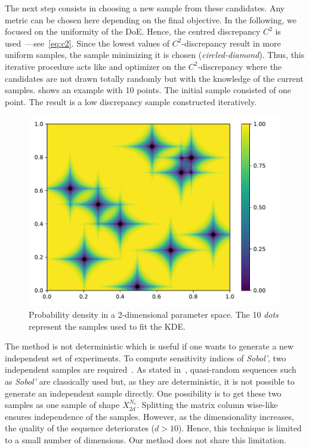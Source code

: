 The next step consists in choosing a new sample from these candidates. Any metric can be chosen here depending on the final objective. In the following, we focused on the uniformity of the DoE. Hence, the centred discrepancy $C^2$ is used~\citep{Fang2006}---see~\cref{eq:c2}. Since the lowest values of $C^2$-discrepancy result in more uniform samples, the sample minimizing it is chosen (\emph{circled-diamond}). Thus, this iterative procedure acts like and optimizer on the $C^2$-discrepancy where the candidates are not drawn totally randomly but with the knowledge of the current samples.  shows an example with 10 points. The initial sample consisted of one point. The result is a low discrepancy sample constructed iteratively.

\begin{figure}[!h]
\centering
\includegraphics[width=0.9\linewidth,keepaspectratio]{fig/contributions/doe/10_star.pdf}
\caption{Probability density in a 2-dimensional parameter space. The 10 \emph{dots} represent the samples used to fit the KDE.}
\label{fig:star}
\end{figure}

The method is not deterministic which is useful if one wants to generate a new independent set of experiments. To compute sensitivity indices of \emph{Sobol'}, two independent samples are required~\citep{Saltelli2010}. As stated in~\citep{Saltelli2010}, quasi-random sequences such as \emph{Sobol'} are classically used but, as they are deterministic, it is not possible to generate an independent sample directly. One possibility is to get these two samples as one sample of shape $X_{2d}^{N_s}$. Splitting the matrix column wise-like ensures independence of the samples. However, as the dimensionality increases, the quality of the sequence deteriorates ($d > 10$). Hence, this technique is limited to a small number of dimensions. Our method does not share this limitation.


